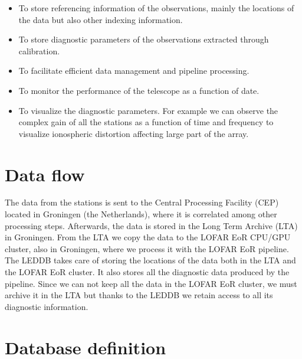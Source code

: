 \documentclass[11pt,twoside]{article}
\begin{document}
\begin{itemize}
\item To store referencing information of the observations, mainly the locations of the data but also other indexing information.
\item To store diagnostic parameters of the observations extracted through calibration.
\item To facilitate efficient data management and pipeline processing.
\item To monitor the performance of the telescope as a function of date.
\item To visualize the diagnostic parameters. For example we can observe the complex gain of all the stations as a function of time and frequency to visualize ionospheric distortion affecting large part of the array.
\end{itemize}

\section{Data flow}
The data from the stations is sent to the Central Processing Facility (CEP) located in Groningen (the Netherlands), where it is correlated among other processing steps. Afterwards, the data is stored in the Long Term Archive (LTA) in Groningen. From the LTA we copy the data to the LOFAR EoR CPU/GPU cluster, also in Groningen, where we process it with the LOFAR EoR pipeline. The LEDDB takes care of storing the locations of the data both in the LTA and the LOFAR EoR cluster. It also stores all the diagnostic data produced by the pipeline. Since we can not keep all the data in the LOFAR EoR cluster, we must archive it in the LTA but thanks to the LEDDB we retain access to all its diagnostic information.

\section{Database definition} 
\end{document}
